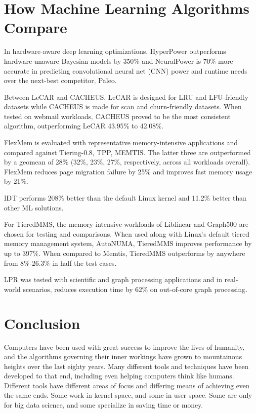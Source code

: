 \documentclass[conference]{IEEEtran}
\begin{document}
\section{How Machine Learning Algorithms Compare}
In hardware-aware deep learning optimizations, HyperPower outperforms hardware-unaware Bayesian models by 350\% and NeuralPower is 70\% more accurate in predicting convolutional neural net (CNN) power and runtime needs over the next-best competitor, Paleo. 

Between LeCAR and CACHEUS, LeCAR is designed for LRU and LFU-friendly datasets while CACHEUS is made for scan and churn-friendly datasets.  When tested on webmail workloads, CACHEUS proved to be the most consistent algorithm, outperforming LeCAR 43.95\% to 42.08\%. 

FlexMem is evaluated with representative memory-intensive applications and compared against Tiering-0.8, TPP, MEMTIS.  The latter three are outperformed by a geomean of 28\% (32\%, 23\%, 27\%, respectively, across all workloads overall).  FlexMem reduces page migration failure by 25\% and improves fast memory usage by 21\%. 

IDT performs 208\% better than the default Linux kernel and 11.2\% better than other ML solutions. 

For TieredMMS, the memory-intensive workloads of Liblinear and Graph500 are chosen for testing and comparisons.  When used along with Linux’s default tiered memory management system, AutoNUMA, TieredMMS improves performance by up to 397\%.  When compared to Memtis, TieredMMS outperforms by anywhere from 8\%-26.3\% in half the test cases. 

LPR was tested with scientific and graph processing applications and in real-world scenarios, reduces execution time by 62\% on out-of-core graph processing. 

\section{Conclusion}
Computers have been used with great success to improve the lives of humanity, and the algorithms governing their inner workings have grown to mountainous heights over the last eighty years.  Many different tools and techniques have been developed to that end, including even helping computers think like humans.  Different tools have different areas of focus and differing means of achieving even the same ends.  Some work in kernel space, and some in user space.  Some are only for big data science, and some specialize in saving time or money.
\end{document}
